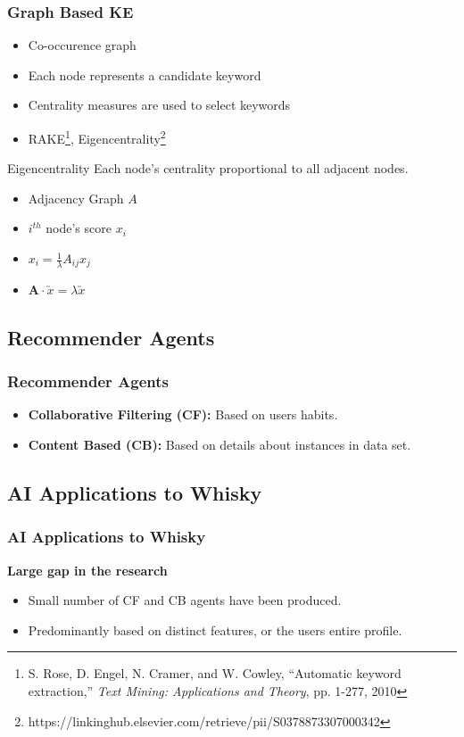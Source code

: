 \documentclass{beamer}
\begin{document}
\begin{frame}
    \frametitle{Graph Based KE}
    \begin{itemize}
        \item Co-occurence graph
        \item Each node represents a candidate keyword
        \item Centrality measures are used to select keywords
        \item RAKE\footnote{ S. Rose, D. Engel, N. Cramer, and W. Cowley, 
        ``Automatic keyword extraction,'' \emph{Text Mining:
        Applications and Theory}, pp. 1-277, 2010}, Eigencentrality\footnote{https://linkinghub.elsevier.com/retrieve/pii/S0378873307000342}
    \end{itemize}
    \begin{block}{Eigencentrality}
        Each node's centrality proportional to all adjacent nodes.
        \begin{itemize}
            \item Adjacency Graph $A$ 
            \item $i^{th}$ node's score $x_i$ 
            \item $x_i = \frac{1}{\lambda}A_{ij}x_j$
            \item $\textbf{A}\cdot \utilde{x} = \lambda \utilde{x}$
        \end{itemize}

    \end{block}
\end{frame}

\subsection{Recommender Agents}
\begin{frame}
    \frametitle{Recommender Agents}
    \begin{itemize}
        \item \textbf{Collaborative Filtering (CF): }Based on users habits.
        \item \textbf{Content Based (CB): }Based on details about instances in data set.
    \end{itemize}
\end{frame}

\subsection{AI Applications to Whisky}
\begin{frame}
    \frametitle{AI Applications to Whisky}
    \textbf{Large gap in the research}
    \begin{itemize}
        \item Small number of CF and CB agents have been produced.
        \item Predominantly based on distinct features, or the users
        entire profile.
    \end{itemize}
\end{frame}
\end{document}
